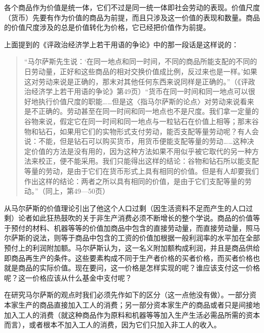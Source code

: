 各个商品作为价值是统一体，它们不过是同一统一体即社会劳动的表现。价值尺度（货币）先要有作为价值的商品为前提，而且只涉及这一价值的表现和数量。商品的价值尺度涉及的总是价值转化为价格，它已经把价值作为前提。

上面提到的《评政治经济学上若干用语的争论》中的那一段话是这样说的：

\begin{quote}{“马尔萨斯先生说：‘在同一地点和同一时间，不同的商品所能支配的不同的日劳动量，正好和这些商品的相对交换价值成比例，反过来也是一样。’如果这对劳动来说是正确的，那末对其他任何东西来说同样是正确的。”（《评政治经济学上若干用语的争论》第49页）“货币在同一时间和同一地点可以很好地执行价值尺度的职能……但是这〈指马尔萨斯的论点〉对劳动来说看来是不正确的。劳动甚至在同一时间和同一地点也不是尺度。我们拿一定量的谷物来说，假定它在同一时间和同一地点与一粒钻石在价值上相等；那末谷物和钻石，如果用它们的实物形式支付劳动，能否支配等量劳动呢？有人会说：不能，但是钻石可以购买货币，用货币便能支配等量的劳动……这种决定价值的方法是没有用的，因为这种方法如果不用似乎被它取代的另一种方法来校正，便不能采用。我们只能得出这样的结论：谷物和钻石所以能支配等量的劳动，是由于它们在货币形式上具有相同的价值。但是有人却要我们作出这样的结论：两者之所以具有相同的价值，是由于它们支配等量的劳动。”（同上，第49—50页）}\end{quote}


从马尔萨斯的价值理论引出了他这个人口过剩（因生活资料不足而产生的人口过剩）论者如此狂热鼓吹的关于非生产消费必须不断增长的整个学说。商品的价值等于预付的材料、机器等等的价值加商品中包含的直接劳动量，而直接劳动量，照马尔萨斯的说法，则等于商品中包含的工资的价值加根据一般利润率的水平加在全部预付上的利润附加额。马尔萨斯认为，这一名义附加额构成利润，并且是商品供给即商品再生产的条件。这些要素构成不同于生产者价格的买者价格，而买者价格也就是商品的实际价值。现在要问，这一价格是怎样实现的呢？谁应该支付这一价格呢？这一价格应该从什么基金中支付呢？

在研究马尔萨斯的观点时我们必须先作如下的区分（这一点他没有做）。一部分资本家生产的商品直接加入工人的消费；另一部分资本家生产的商品或者只是间接地加入工人的消费（就这种商品作为原料和机器等等加入生产生活必需品所需的资本而言），或者根本不加入工人的消费，因为它们只加入非工人的收入。

